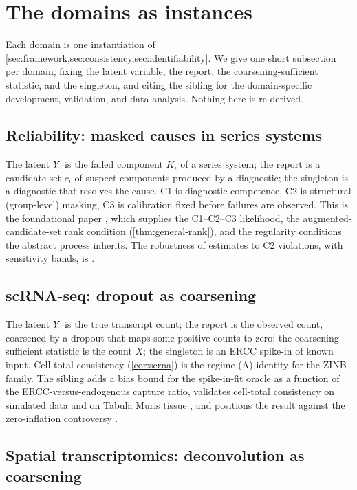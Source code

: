 \section{The domains as instances}
\label{sec:applications}

Each domain is one instantiation of \cref{sec:framework,sec:consistency,sec:identifiability}.
We give one short subsection per domain, fixing the latent variable,
the report, the coarsening-sufficient statistic, and the singleton, and
citing the sibling for the domain-specific development, validation, and
data analysis. Nothing here is re-derived.

\subsection{Reliability: masked causes in series systems}

The latent $Y$ is the failed component $K_i$ of a series system; the
report is a candidate set $c_i$ of suspect components produced by a
diagnostic; the singleton is a diagnostic that resolves the cause. C1
is diagnostic competence, C2 is structural (group-level) masking, C3 is
calibration fixed before failures are observed. This is the
foundational paper \citep{towell2026masked}, which supplies the
C1--C2--C3 likelihood, the augmented-candidate-set rank condition
(\cref{thm:general-rank}), and the regularity conditions the abstract
process inherits. The robustness of estimates to C2 violations, with
sensitivity bands, is \citet{towell2026mdrelax}.

\subsection{scRNA-seq: dropout as coarsening}

The latent $Y$ is the true transcript count; the report is the
observed count, coarsened by a dropout that maps some positive counts
to zero; the coarsening-sufficient statistic is the count $X$; the
singleton is an ERCC spike-in of known input. Cell-total consistency
(\cref{cor:scrna}) is the regime-(A) identity for the ZINB family. The
sibling \citep{towell2026scrnacoarsening} adds a bias bound for the
spike-in-fit oracle as a function of the ERCC-versus-endogenous capture
ratio, validates cell-total consistency on simulated data and on Tabula
Muris tissue \citep{tabula2018single}, and positions the result
against the zero-inflation controversy \citep{jiang2022zero}.

\subsection{Spatial transcriptomics: deconvolution as coarsening}

